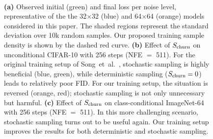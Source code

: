 {\begin{figure}[t]
{\begin{tikzpicture}
\end{tikzpicture}
}\\\hfill%
\hfill%
\hfill%
\hfill%
\caption{\label{fig:TrainingPlots}%
\textbf{(a)}
Observed initial (green) and final loss per noise level, representative of the the 32$\times$32 (blue) and 64$\times$64 (orange) models considered in this paper. The shaded regions represent the standard deviation over 10k random samples. Our proposed training sample density is shown by the dashed red curve.
\textbf{(b)}
{Effect of $S_\text{churn}$ on unconditional CIFAR-10 with 256 steps (NFE $=$ 511).}
For the original training setup of Song~et~al.~\cite{Song2021sde}, stochastic sampling is highly beneficial (blue, green), while deterministic sampling ($S_\text{churn} = 0$) leads to relatively poor FID.
For our training setup, the situation is reversed (orange, red); stochastic sampling is not only unnecessary but harmful.
{\textbf{(c)}
Effect of $S_\text{churn}$ on class-conditional ImageNet-64 with 256 steps (NFE $=$ 511).
In this more challenging scenario, stochastic sampling turns out to be useful again.
Our training setup improves the results for both deterministic and stochastic sampling.
}
}
\vspace*{-2mm}
\end{figure}
}

